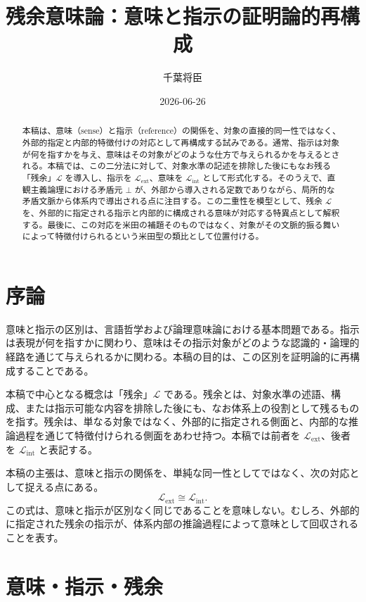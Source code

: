 \documentclass[11pt,a4paper]{article}
\newcommand{\lhagma}{\mathcal{L}}
\newcommand{\lext}{\lhagma_{\mathrm{ext}}}
\newcommand{\lint}{\lhagma_{\mathrm{int}}}
\theoremstyle{definition}
\begin{document}
\title{残余意味論：意味と指示の証明論的再構成}
\author{千葉将臣}
\date{2026-06-26}
\maketitle

\begin{abstract}
本稿は、意味（sense）と指示（reference）の関係を、対象の直接的同一性ではなく、外部的指定と内部的特徴付けの対応として再構成する試みである。通常、指示は対象が何を指すかを与え、意味はその対象がどのような仕方で与えられるかを与えるとされる。本稿では、この二分法に対して、対象水準の記述を排除した後にもなお残る「残余」$\lhagma$ を導入し、指示を $\lext$、意味を $\lint$ として形式化する。そのうえで、直観主義論理における矛盾元 $\bot$ が、外部から導入される定数でありながら、局所的な矛盾文脈から体系内で導出される点に注目する。この二重性を模型として、残余 $\lhagma$ を、外部的に指定される指示と内部的に構成される意味が対応する特異点として解釈する。最後に、この対応を米田の補題そのものではなく、対象がその文脈的振る舞いによって特徴付けられるという米田型の類比として位置付ける。
\end{abstract}

\section{序論}

意味と指示の区別は、言語哲学および論理意味論における基本問題である。指示は表現が何を指すかに関わり、意味はその指示対象がどのような認識的・論理的経路を通じて与えられるかに関わる。本稿の目的は、この区別を証明論的に再構成することである。

本稿で中心となる概念は「残余」$\lhagma$ である。残余とは、対象水準の述語、構成、または指示可能な内容を排除した後にも、なお体系上の役割として残るものを指す。残余は、単なる対象ではなく、外部的に指定される側面と、内部的な推論過程を通じて特徴付けられる側面をあわせ持つ。本稿では前者を $\lext$、後者を $\lint$ と表記する。

本稿の主張は、意味と指示の関係を、単純な同一性としてではなく、次の対応として捉える点にある。
\[
\lext \cong \lint .
\]
この式は、意味と指示が区別なく同じであることを意味しない。むしろ、外部的に指定された残余の指示が、体系内部の推論過程によって意味として回収されることを表す。

\section{意味・指示・残余}
\end{document}
